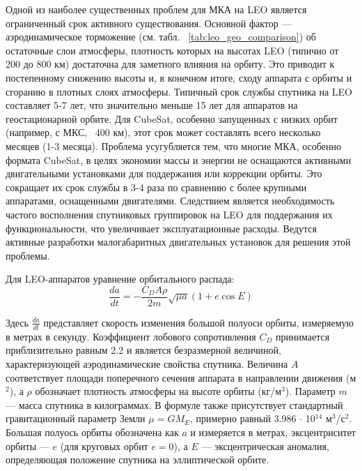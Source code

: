 Одной из наиболее существенных проблем для МКА на LEO является ограниченный срок активного существования. Основной фактор — аэродинамическое торможение (см. табл. ~\ref{tab:leo_geo_comparison}) об остаточные слои атмосферы, плотность которых на высотах LEO (типично от 200 до 800 км) достаточна для заметного влияния на орбиту\cite{leo_lifespan_smith_2021}. Это приводит к постепенному снижению высоты и, в конечном итоге, сходу аппарата с орбиты и сгоранию в плотных слоях атмосферы. Типичный срок службы спутника на LEO составляет 5-7 лет, что значительно меньше 15 лет для аппаратов на геостационарной орбите\cite{leo_lifespan_smith_2021}. Для CubeSat, особенно запущенных с низких орбит (например, с МКС, ~400 км), этот срок может составлять всего несколько месяцев (1-3 месяца)\cite{cubesat_low_orbit_nasa_2020}. Проблема усугубляется тем, что многие МКА, особенно формата CubeSat, в целях экономии массы и энергии не оснащаются активными двигательными установками для поддержания или коррекции орбиты\cite{cubesat_standard_2014}. Это сокращает их срок службы в 3-4 раза по сравнению с более крупными аппаратами, оснащенными двигателями\cite{cubesat_standard_2014}. Следствием является необходимость частого восполнения спутниковых группировок на LEO для поддержания их функциональности, что увеличивает эксплуатационные расходы\cite{leo_lifespan_smith_2021}. Ведутся активные разработки малогабаритных двигательных установок для решения этой проблемы\cite{cubesat_standard_2014}.

Для LEO-аппаратов уравнение орбитального распада:
\begin{equation}
\frac{da}{dt} = -\frac{C_D A \rho}{2m} \sqrt{\mu a}(1 + e\cos E)
\end{equation}

Здесь $\frac{da}{dt}$ представляет скорость изменения большой полуоси орбиты, измеряемую в метрах в секунду. Коэффициент лобового сопротивления $C_D$ принимается приблизительно равным 2.2 и является безразмерной величиной, характеризующей аэродинамические свойства спутника. Величина $A$ соответствует площади поперечного сечения аппарата в направлении движения (м$^2$), а $\rho$ обозначает плотность атмосферы на высоте орбиты (кг/м$^3$). Параметр $m$ — масса спутника в килограммах. В формуле также присутствует стандартный гравитационный параметр Земли $\mu = GM_E$, примерно равный 3.986 $\cdot$ 10$^{14}$ м$^3$/с$^2$. Большая полуось орбиты обозначена как $a$ и измеряется в метрах, эксцентриситет орбиты — $e$ (для круговых орбит $e = 0$), а $E$ — эксцентрическая аномалия, определяющая положение спутника на эллиптической орбите.

